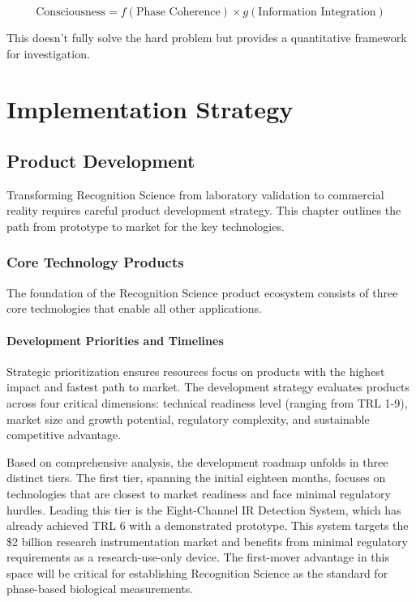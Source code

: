 \documentclass[12pt,a4paper]{report}
\begin{document}
\begin{equation}
\text{Consciousness} = f(\text{Phase Coherence}) \times g(\text{Information Integration})
\end{equation}

This doesn't fully solve the hard problem but provides a quantitative framework for investigation.

\part{Implementation Strategy}

\chapter{Product Development}

Transforming Recognition Science from laboratory validation to commercial reality requires careful product development strategy. This chapter outlines the path from prototype to market for the key technologies.

\section{Core Technology Products}

The foundation of the Recognition Science product ecosystem consists of three core technologies that enable all other applications.

\subsection{Development Priorities and Timelines}

Strategic prioritization ensures resources focus on products with the highest impact and fastest path to market. The development strategy evaluates products across four critical dimensions: technical readiness level (ranging from TRL 1-9), market size and growth potential, regulatory complexity, and sustainable competitive advantage.

Based on comprehensive analysis, the development roadmap unfolds in three distinct tiers. The first tier, spanning the initial eighteen months, focuses on technologies that are closest to market readiness and face minimal regulatory hurdles. Leading this tier is the Eight-Channel IR Detection System, which has already achieved TRL 6 with a demonstrated prototype. This system targets the \$2 billion research instrumentation market and benefits from minimal regulatory requirements as a research-use-only device. The first-mover advantage in this space will be critical for establishing Recognition Science as the standard for phase-based biological measurements.
\end{document}
